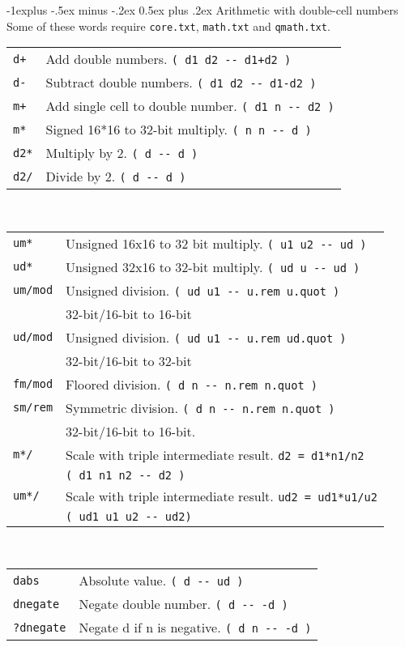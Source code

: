 \documentclass[10pt,landscape,a4paper]{article}
\makeatletter
\renewcommand{\subsection}{\@startsection{subsection}{2}{0mm}%
                                {-1explus -.5ex minus -.2ex}%
                                {0.5ex plus .2ex}%
                                {\normalfont\normalsize\bfseries}}
\makeatother
\begin{document}
\begin{multicols}{3}
\subsection{Arithmetic with double-cell numbers}
Some of these words require \verb!core.txt!, \verb!math.txt! and \verb!qmath.txt!.
\begin{tabular}{@{}ll@{}}
\verb!d+!  & Add double numbers. \verb!( d1 d2 -- d1+d2 )! \\
\verb!d-!  & Subtract double numbers. \verb!( d1 d2 -- d1-d2 )! \\
\verb!m+!  & Add single cell to double number.  \verb!( d1 n -- d2 )! \\
\verb!m*!  & Signed 16*16 to 32-bit multiply.  \verb!( n n -- d )! \\
\verb!d2*!  & Multiply by 2. \verb!( d -- d )! \\
\verb!d2/!  & Divide by 2. \verb!( d -- d )! \\
\end{tabular} \\
\begin{tabular}{@{}ll@{}}
\verb!um*!  & Unsigned 16x16 to 32 bit multiply. \verb!( u1 u2 -- ud )! \\
\verb!ud*!  & Unsigned 32x16 to 32-bit multiply. \verb!( ud u -- ud )! \\
\verb!um/mod!  & Unsigned division. \verb!( ud u1 -- u.rem u.quot )! \\
               & 32-bit/16-bit to 16-bit \\
\verb!ud/mod!  & Unsigned division. \verb!( ud u1 -- u.rem ud.quot )! \\
               & 32-bit/16-bit to 32-bit \\
\verb!fm/mod!  & Floored division. \verb!( d n -- n.rem n.quot )! \\
\verb!sm/rem!  & Symmetric division. \verb!( d n -- n.rem n.quot )! \\
               & 32-bit/16-bit to 16-bit. \\
\verb!m*/!     & Scale with triple intermediate result. \verb!d2 = d1*n1/n2! \\
               & \verb!( d1 n1 n2 -- d2 )! \\
\verb!um*/!    & Scale with triple intermediate result. \verb!ud2 = ud1*u1/u2! \\
               & \verb!( ud1 u1 u2 -- ud2) ! \\
\end{tabular} \\
\begin{tabular}{@{}ll@{}}
\verb!dabs!  & Absolute value. \verb!( d -- ud )! \\
\verb!dnegate!  & Negate double number. \verb!( d -- -d )! \\
\verb!?dnegate!  & Negate d if n is negative. \verb!( d n -- -d )! \\
\end{tabular} \\


\end{multicols}
\end{document}
